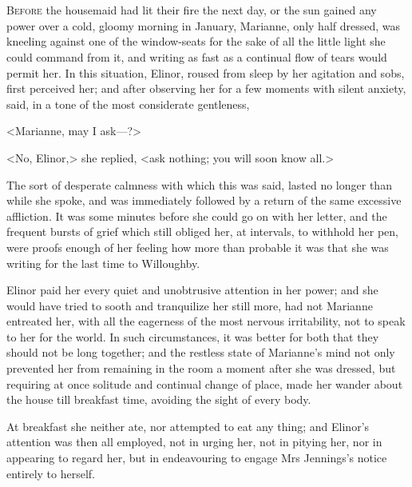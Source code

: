 \chapter[Chapter \thechapter]{}
\lettrine[lraise=0.3]{B}{efore} the housemaid had lit their fire the next day, or the sun gained any power over a cold, gloomy morning in January, Marianne, only half dressed, was kneeling against one of the window-seats for the sake of all the little light she could command from it, and writing as fast as a continual flow of tears would permit her. In this situation, Elinor, roused from sleep by her agitation and sobs, first perceived her; and after observing her for a few moments with silent anxiety, said, in a tone of the most considerate gentleness,

<Marianne, may I ask—?>

<No, Elinor,> she replied, <ask nothing; you will soon know all.>

The sort of desperate calmness with which this was said, lasted no longer than while she spoke, and was immediately followed by a return of the same excessive affliction. It was some minutes before she could go on with her letter, and the frequent bursts of grief which still obliged her, at intervals, to withhold her pen, were proofs enough of her feeling how more than probable it was that she was writing for the last time to Willoughby.

Elinor paid her every quiet and unobtrusive attention in her power; and she would have tried to sooth and tranquilize her still more, had not Marianne entreated her, with all the eagerness of the most nervous irritability, not to speak to her for the world. In such circumstances, it was better for both that they should not be long together; and the restless state of Marianne's mind not only prevented her from remaining in the room a moment after she was dressed, but requiring at once solitude and continual change of place, made her wander about the house till breakfast time, avoiding the sight of every body.

At breakfast she neither ate, nor attempted to eat any thing; and Elinor's attention was then all employed, not in urging her, not in pitying her, nor in appearing to regard her, but in endeavouring to engage Mrs Jennings's notice entirely to herself.

